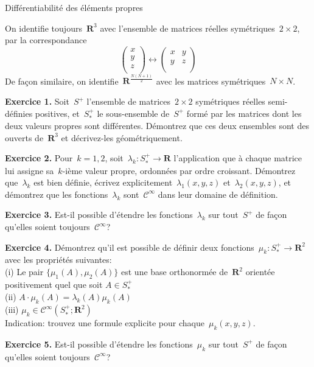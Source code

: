 \documentclass[a4paper,11pt]{article}
\def\R{\mathbf{R}}
\begin{document}
\thispagestyle{empty}

\begin{center}
	\Large Différentiabilité des éléments propres
\end{center}

On identifie toujours~$\R^3$ avec l'ensemble de matrices réelles symétriques~$2\times
2$, par la correspondance
\[
	\begin{pmatrix}
		x\\
		y\\
		z\\
	\end{pmatrix}
	\longleftrightarrow
	\begin{pmatrix}
		x & y \\
		y & z \\
	\end{pmatrix}
\]
De façon similaire, on identifie~$\R^{\frac{N(N+1)}{2}}$
avec les matrices symétriques~$N\times N$.

{\bf Exercice 1.}
Soit~$S^+$ l'ensemble de matrices~$2\times 2$ symétriques réelles semi-définies
positives, et~$S^+_*$ le sous-ensemble de~$S^+$ formé par les matrices dont les
deux valeurs propres sont différentes.  Démontrez que ces deux ensembles sont
des ouverts de~$\R^3$ et décrivez-les géométriquement.

{\bf Exercice 2.}
Pour~$k=1,2$, soit~$\lambda_k:S^+_*\to\R$ l'application que à chaque matrice
lui assigne sa~$k$-ième valeur propre, ordonnées par ordre croissant.
Démontrez que~$\lambda_k$ est bien définie,
écrivez
explicitement~$\lambda_1(x,y,z)$ et~$\lambda_2(x,y,z)$, et démontrez que les
fonctions~$\lambda_k$ sont~$\mathcal{C}^\infty$ dans leur domaine de
définition.

{\bf Exercice 3.} Est-il possible d'étendre les fonctions~$\lambda_k$ sur
tout~$S^+$ de façon qu'elles soient toujours~$\mathcal{C}^\infty$?

{\bf Exercice 4.}
Démontrez qu'il est possible de définir deux fonctions~$\mu_k:S^+_*\to\R^2$
avec les propriétés suivantes:\\
(i) Le pair
$\{\mu_1(A),\mu_2(A)\}$ est une base orthonormée
de~$\R^2$ orientée positivement quel que soit
$A\in S^+_*$\\
(ii) $A\cdot\mu_k(A)=\lambda_k(A)\mu_k(A)$\\
(iii) $\mu_k\in\mathcal{C}^\infty(S^+_*;\R^2)$\\
Indication: trouvez une formule explicite pour chaque~$\mu_k(x,y,z)$.


{\bf Exercice 5.}
Est-il possible d'étendre les fonctions~$\mu_k$ sur
tout~$S^+$ de façon qu'elles soient toujours~$\mathcal{C}^\infty$?
\end{document}
